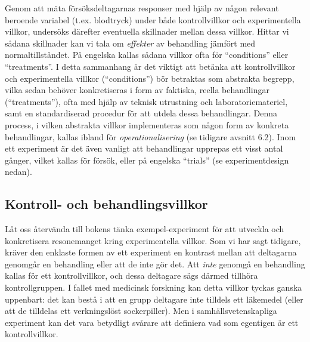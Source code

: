 \documentclass[
]{book}
\begin{document}
Genom att mäta försöksdeltagarnas responser med hjälp av någon relevant beroende variabel (t.ex. blodtryck) under både kontrollvillkor och experimentella villkor, undersöks därefter eventuella skillnader mellan dessa villkor. Hittar vi sådana skillnader kan vi tala om \emph{effekter} av behandling jämfört med normaltillståndet. På engelska kallas sådana villkor ofta för ``conditions'' eller ``treatments''. I detta sammanhang är det viktigt att betänka att kontrollvillkor och experimentella villkor (``conditions'') bör betraktas som abstrakta begrepp, vilka sedan behöver konkretiseras i form av faktiska, reella behandlingar (``treatments''), ofta med hjälp av teknisk utrustning och laboratoriemateriel, samt en standardiserad procedur för att utdela dessa behandlingar. Denna process, i vilken abstrakta villkor implementeras som någon form av konkreta behandlingar, kallas ibland för \emph{operationalisering} (se tidigare avsnitt 6.2). Inom ett experiment är det även vanligt att behandlingar upprepas ett visst antal gånger, vilket kallas för försök, eller på engelska ``trials'' (se experimentdesign nedan).

\hypertarget{sub07.4.1}{%
\subsection{Kontroll- och behandlingsvillkor}\label{sub07.4.1}}

Låt oss återvända till bokens tänka exempel-experiment för att utveckla och konkretisera resonemanget kring experimentella villkor. Som vi har sagt tidigare, kräver den enklaste formen av ett experiment en kontrast mellan att deltagarna genomgår en behandling eller att de inte gör det. Att \emph{inte} genomgå en behandling kallas för ett kontrollvillkor, och dessa deltagare sägs därmed tillhöra kontrollgruppen. I fallet med medicinsk forskning kan detta villkor tyckas ganska uppenbart: det kan bestå i att en grupp deltagare inte tilldels ett läkemedel (eller att de tilldelas ett verkningslöst sockerpiller). Men i samhällsvetenskapliga experiment kan det vara betydligt svårare att definiera vad som egentigen är ett kontrollvillkor.
\end{document}

